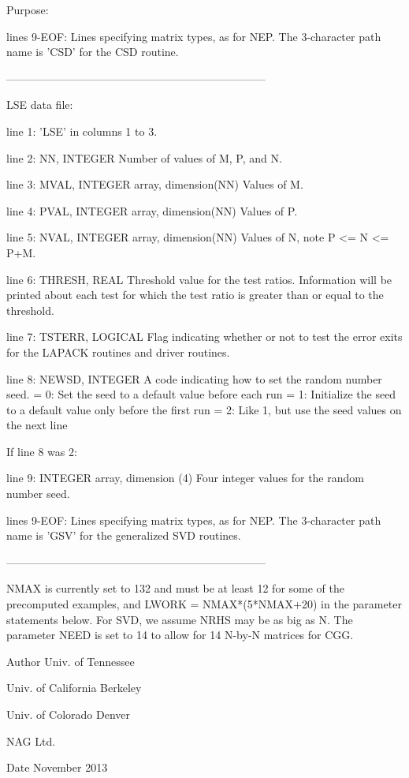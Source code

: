 \begin{DoxyParagraph}{Purpose\+: }
\begin{DoxyVerb}
 lines 9-EOF:  Lines specifying matrix types, as for NEP.
          The 3-character path name is 'CSD' for the CSD routine.

-----------------------------------------------------------------------

 LSE data file:

 line 1:  'LSE' in columns 1 to 3.

 line 2:  NN, INTEGER
          Number of values of M, P, and N.

 line 3:  MVAL, INTEGER array, dimension(NN)
          Values of M.

 line 4:  PVAL, INTEGER array, dimension(NN)
          Values of P.

 line 5:  NVAL, INTEGER array, dimension(NN)
          Values of N, note P <= N <= P+M.

 line 6:  THRESH, REAL
          Threshold value for the test ratios.  Information will be
          printed about each test for which the test ratio is greater
          than or equal to the threshold.

 line 7:  TSTERR, LOGICAL
          Flag indicating whether or not to test the error exits for
          the LAPACK routines and driver routines.

 line 8:  NEWSD, INTEGER
          A code indicating how to set the random number seed.
          = 0:  Set the seed to a default value before each run
          = 1:  Initialize the seed to a default value only before the
                first run
          = 2:  Like 1, but use the seed values on the next line

 If line 8 was 2:

 line 9:  INTEGER array, dimension (4)
          Four integer values for the random number seed.

 lines 9-EOF:  Lines specifying matrix types, as for NEP.
          The 3-character path name is 'GSV' for the generalized
          SVD routines.

-----------------------------------------------------------------------

 NMAX is currently set to 132 and must be at least 12 for some of the
 precomputed examples, and LWORK = NMAX*(5*NMAX+20) in the parameter
 statements below.  For SVD, we assume NRHS may be as big as N.  The
 parameter NEED is set to 14 to allow for 14 N-by-N matrices for CGG.\end{DoxyVerb}
 
\end{DoxyParagraph}
\begin{DoxyAuthor}{Author}
Univ. of Tennessee 

Univ. of California Berkeley 

Univ. of Colorado Denver 

N\+A\+G Ltd. 
\end{DoxyAuthor}
\begin{DoxyDate}{Date}
November 2013 
\end{DoxyDate}
\hypertarget{group__complex__eig_ga712d308fd40a2f0f279fe4a0c8544a30}{}
